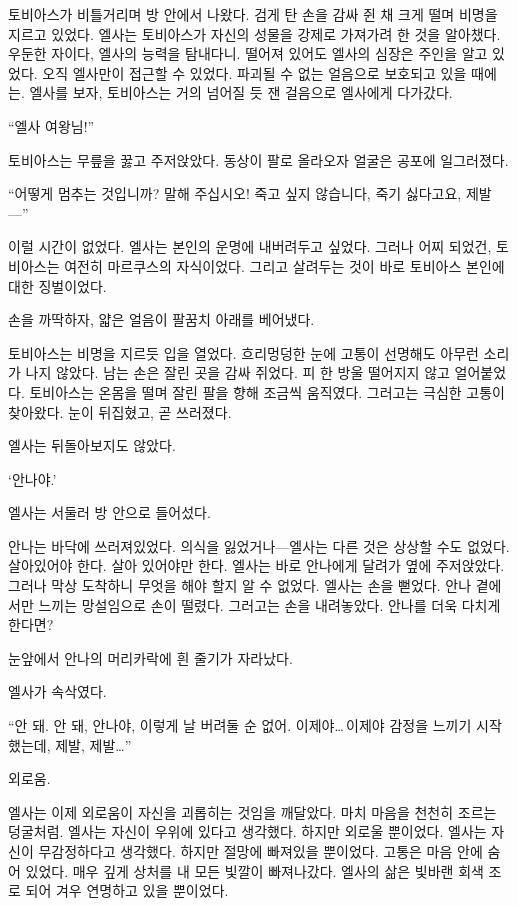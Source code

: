 토비아스가 비틀거리며 방 안에서 나왔다. 검게 탄 손을 감싸 쥔 채 크게 떨며 비명을 지르고 있었다. 엘사는 토비아스가 자신의 성물을 강제로 가져가려 한 것을 알아챘다. 우둔한 자이다, 엘사의 능력을 탐내다니. 떨어져 있어도 엘사의 심장은 주인을 알고 있었다. 오직 엘사만이 접근할 수 있었다. 파괴될 수 없는 얼음으로 보호되고 있을 때에는. 엘사를 보자, 토비아스는 거의 넘어질 듯 잰 걸음으로 엘사에게 다가갔다.

``엘사 여왕님!''

토비아스는 무릎을 꿇고 주저앉았다. 동상이 팔로 올라오자 얼굴은 공포에 일그러졌다.

``어떻게 멈추는 것입니까? 말해 주십시오! 죽고 싶지 않습니다, 죽기 싫다고요, 제발—''

이럴 시간이 없었다. 엘사는 본인의 운명에 내버려두고 싶었다. 그러나 어찌 되었건, 토비아스는 여전히 마르쿠스의 자식이었다. 그리고 살려두는 것이 바로 토비아스 본인에 대한 징벌이었다.

손을 까딱하자, 얇은 얼음이 팔꿈치 아래를 베어냈다.

토비아스는 비명을 지르듯 입을 열었다. 흐리멍덩한 눈에 고통이 선명해도 아무런 소리가 나지 않았다. 남는 손은 잘린 곳을 감싸 쥐었다. 피 한 방울 떨어지지 않고 얼어붙었다. 토비아스는 온몸을 떨며 잘린 팔을 향해 조금씩 움직였다. 그러고는 극심한 고통이 찾아왔다. 눈이 뒤집혔고, 곧 쓰러졌다.

엘사는 뒤돌아보지도 않았다.

`안나야.'

엘사는 서둘러 방 안으로 들어섰다.

안나는 바닥에 쓰러져있었다. 의식을 잃었거나—엘사는 다른 것은 상상할 수도 없었다. 살아있어야 한다. 살아 있어야만 한다. 엘사는 바로 안나에게 달려가 옆에 주저앉았다. 그러나 막상 도착하니 무엇을 해야 할지 알 수 없었다. 엘사는 손을 뻗었다. 안나 곁에서만 느끼는 망설임으로 손이 떨렸다. 그러고는 손을 내려놓았다. 안나를 더욱 다치게 한다면?

눈앞에서 안나의 머리카락에 흰 줄기가 자라났다.

엘사가 속삭였다.

``안 돼. 안 돼, 안나야, 이렇게 날 버려둘 순 없어. 이제야\ldots\,이제야 감정을 느끼기 시작했는데, 제발, 제발\ldots''

외로움.

엘사는 이제 외로움이 자신을 괴롭히는 것임을 깨달았다. 마치 마음을 천천히 조르는 덩굴처럼. 엘사는 자신이 우위에 있다고 생각했다. 하지만 외로울 뿐이었다. 엘사는 자신이 무감정하다고 생각했다. 하지만 절망에 빠져있을 뿐이었다. 고통은 마음 안에 숨어 있었다. 매우 깊게 상처를 내 모든 빛깔이 빠져나갔다. 엘사의 삶은 빛바랜 회색 조로 되어 겨우 연명하고 있을 뿐이었다.

